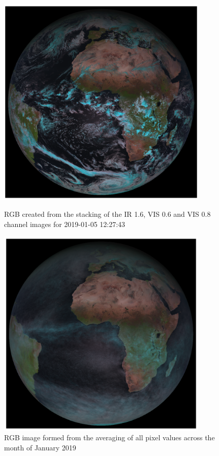 \begin{figure}[!hbt]
    \centering
    \begin{minipage}{0.45\textwidth}
        \centering
        \includegraphics[width=0.9\textwidth]{2019-01-05 122743.pdf}
        \caption{RGB created from the stacking of the IR 1.6, VIS 0.6 and VIS 0.8 channel images for 2019-01-05 12:27:43 }
        \label{fig:av_rgb}
    \end{minipage}\hfill
        \begin{minipage}{0.45\textwidth}
        \centering
        \includegraphics[width=0.9\textwidth]{2019-01-05 122743_av.pdf}
        \caption{RGB image formed from the averaging of all pixel values across the month of January 2019}
        \label{fig:av_cloud}
    \end{minipage}\hfill
\end{figure}

